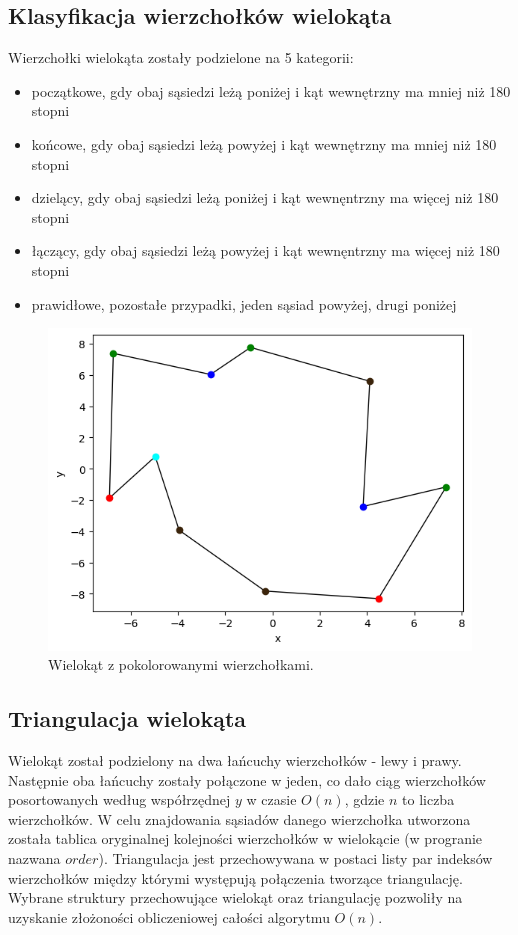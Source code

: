 \documentclass[11pt]{scrartcl}
\begin{document}
    \subsection{Klasyfikacja wierzchołków wielokąta}
    Wierzchołki wielokąta zostały podzielone na 5 kategorii:    

    \begin{itemize}
        \item początkowe, gdy obaj sąsiedzi leżą poniżej i kąt wewnętrzny ma mniej
        niż 180 stopni
        \item końcowe, gdy obaj sąsiedzi leżą powyżej i kąt wewnętrzny ma mniej
        niż 180 stopni
        \item dzielący, gdy obaj sąsiedzi leżą poniżej i kąt wewnęntrzny ma więcej
        niż 180 stopni
        \item łączący, gdy obaj sąsiedzi leżą powyżej i kąt wewnęntrzny ma więcej
        niż 180 stopni
        \item prawidłowe, pozostałe przypadki, jeden sąsiad powyżej, drugi poniżej
    \end{itemize}

    \begin{figure}[H]
        \centering
        \includegraphics[width=0.8\linewidth]{3_3.png}
        \caption{Wielokąt z pokolorowanymi wierzchołkami.}
    \end{figure}

    \subsection{Triangulacja wielokąta}

    Wielokąt został podzielony na dwa łańcuchy wierzchołków - lewy i prawy. Następnie
    oba łańcuchy zostały połączone w jeden, co dało ciąg wierzchołków posortowanych
    według współrzędnej $y$ w czasie $O(n)$, gdzie $n$ to liczba wierzchołków. W celu
    znajdowania sąsiadów danego wierzchołka utworzona została tablica oryginalnej
    kolejności wierzchołków w wielokącie (w progranie nazwana $order$). Triangulacja
    jest przechowywana w postaci listy par indeksów wierzchołków między którymi
    występują połączenia tworzące triangulację. Wybrane struktury przechowujące
    wielokąt oraz triangulację pozwoliły na uzyskanie złożoności obliczeniowej
    całości algorytmu $O(n)$.
\end{document}
